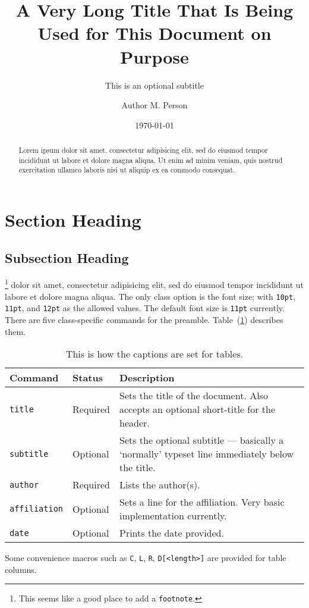 \documentclass[10pt]{salam}
\title[Title for the Header]{A Very Long Title That Is Being Used for This Document on Purpose}
\subtitle{This is an optional subtitle}
\author{Author M. Person}
\affiliation{Some Affiliation, City}
\date{\today}
\begin{document}
\maketitle
\margintoc

\begin{abstract}
  Lorem ipsum dolor sit amet, consectetur adipisicing elit, sed do eiusmod tempor incididunt ut labore et dolore magna aliqua. Ut enim ad minim veniam, quis nostrud exercitation ullamco laboris nisi ut aliquip ex ea commodo consequat.
\end{abstract}

\section{Section Heading}
\subsection{Subsection Heading}
\footnote{This seems like a good place to add a \texttt{footnote}.} dolor sit amet, consectetur adipisicing elit, sed do eiusmod tempor incididunt ut labore et dolore magna aliqua. The only class option is the font size; with \texttt{10pt}, \texttt{11pt}, and \texttt{12pt} as the allowed values. The default font size is \texttt{11pt} currently. There are five class-specific commands for the preamble. Table~(\ref{tab:the-only-table}) describes them.
\begin{table}[h]
\centering
\begin{tabularx}{\linewidth}{p{20mm}p{15mm}X}
\toprule
Command & Status & Description\\
\midrule
\texttt{title} & Required & Sets the title of the document. Also accepts an optional short-title for the header.\\
\texttt{subtitle} & Optional & Sets the optional subtitle --- basically a `normally' typeset line immediately below the title.\\
\texttt{author} & Required & Lists the author(s).\\
\texttt{affiliation} & Optional & Sets a line for the affiliation. Very basic implementation currently.\\
\texttt{date} & Optional & Prints the date provided.\\
\bottomrule
\end{tabularx}
\caption{This is how the captions are set for tables.}
\label{tab:the-only-table}
\end{table}
Some convenience macros such as \texttt{C}, \texttt{L}, \texttt{R}, \texttt{D[<length>]} are provided for table columns.
\end{document}
